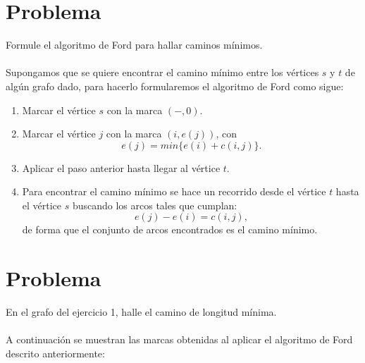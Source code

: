 \documentclass[autocontact]{gaceta}
\begin{document}
\section{Problema}
    Formule el algoritmo de Ford para hallar caminos mínimos.\\
    \\Supongamos que se quiere encontrar el camino mínimo entre los vértices $s$ y $t$ de algún grafo dado,
        para hacerlo formularemos el algoritmo de Ford como sigue:
        \begin{center}
            \begin{enumerate}
                \item Marcar el vértice $s$ con la marca $(-, 0)$.
                \item Marcar el vértice $j$ con la marca $(i, e(j))$, con 
                    \begin{equation}\label{eq:p2-1}
                        e(j) = min \{e(i) + c(i,j)\}. 
                    \end{equation}
                \item Aplicar el paso anterior hasta llegar al vértice $t$.
                \item Para encontrar el camino mínimo se hace un recorrido desde el vértice $t$ hasta el 
                        vértice $s$ buscando los arcos tales que cumplan: 
                        \begin{equation}\label{eq:p2-2}
                            e(j) - e(i) = c(i,j),
                        \end{equation}
                        de forma que el conjunto de arcos encontrados es el camino mínimo.
            \end{enumerate}
        \end{center}





\section{Problema}
    En el grafo del ejercicio 1, halle el camino de longitud mínima.\\
    \\A continuación se muestran las marcas obtenidas al aplicar el algoritmo de Ford 
    descrito anteriormente:
    
\end{document}
